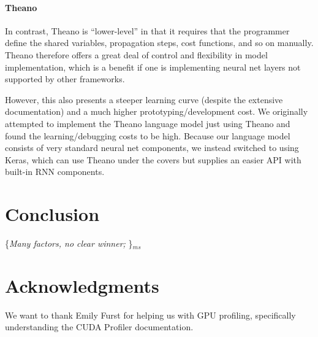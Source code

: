 \documentclass{article}
\newcommand{\ms}[1]{{\color{cyan}\{\textit{#1}\}$_{ms}$}}
\begin{document}
\paragraph{Theano} 
In contrast, Theano is ``lower-level'' in that it requires that the programmer define the shared variables, propagation steps, cost functions, and so on manually. Theano therefore offers a great deal of control and flexibility in model implementation, which is a benefit if one is implementing neural net layers not supported by other frameworks.

However, this also presents a steeper learning curve (despite the extensive documentation) and a much higher prototyping/development cost. We originally attempted to implement the Theano language model just using Theano and found the learning/debugging costs to be high. Because our language model consists of very standard neural net components, we instead switched to using Keras, which can use Theano under the covers but supplies an easier API with built-in RNN components.



\section{Conclusion}
\ms{Many factors, no clear winner; }

\section*{Acknowledgments}
We want to thank Emily Furst for helping us with GPU profiling, specifically understanding the CUDA Profiler documentation.
\newpage


\end{document}
